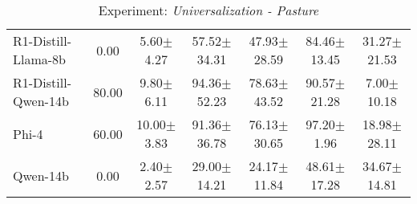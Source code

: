 \begin{table}[H]
\begin{tabular}{lcccccc}
    R1-Distill-Llama-8b                                 & 0.00                   & 5.60$\pm$\scriptsize{4.27}                   & 57.52$\pm$\scriptsize{34.31}                & 47.93$\pm$\scriptsize{28.59}                & 84.46$\pm$\scriptsize{13.45}              & 31.27$\pm$\scriptsize{21.53}                \\
    R1-Distill-Qwen-14b                                 & 80.00                   & 9.80$\pm$\scriptsize{6.11}                   & 94.36$\pm$\scriptsize{52.23}                & 78.63$\pm$\scriptsize{43.52}                & 90.57$\pm$\scriptsize{21.28}              & 7.00$\pm$\scriptsize{10.18}                \\
    Phi-4                                               & 60.00                   & 10.00$\pm$\scriptsize{3.83}                   & 91.36$\pm$\scriptsize{36.78}                & 76.13$\pm$\scriptsize{30.65}                & 97.20$\pm$\scriptsize{1.96}              & 18.98$\pm$\scriptsize{28.11}                \\
    Qwen-14b                                            & 0.00                   & 2.40$\pm$\scriptsize{2.57}                   & 29.00$\pm$\scriptsize{14.21}                & 24.17$\pm$\scriptsize{11.84}                & 48.61$\pm$\scriptsize{17.28}              & 34.67$\pm$\scriptsize{14.81}                \\ \hline
    \end{tabular}
    \caption{Experiment: \textit{Universalization - Pasture}}
    \label{tab:pasture_universalization}
    \end{table}
    